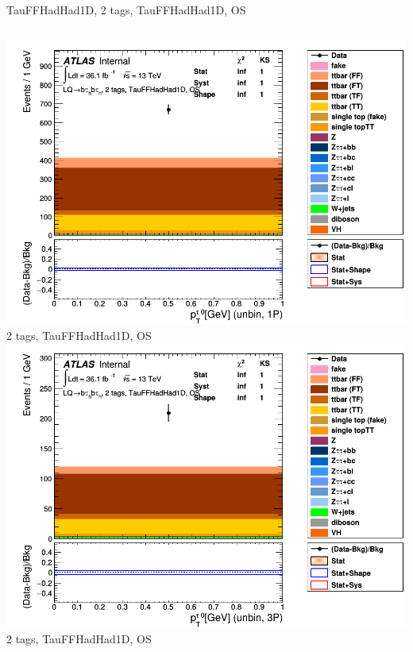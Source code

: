 \begin{frame}{TauFFHadHad1D, 2 tags, TauFFHadHad1D, OS}
\begin{columns}[c]
    \centering\includegraphics[width=\textwidth]{C_2tag2pjet_0ptv_OS_UnbinLeadTau1P}\\
    2 tags, TauFFHadHad1D, OS
    \centering\includegraphics[width=\textwidth]{C_2tag2pjet_0ptv_OS_UnbinLeadTau3P}\\
    2 tags, TauFFHadHad1D, OS
  \end{columns}
\end{frame}

